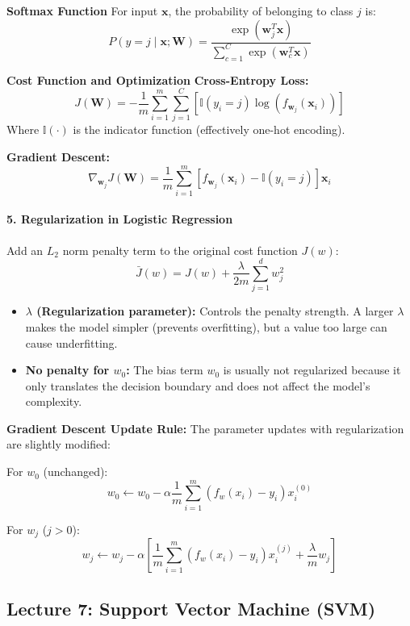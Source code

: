 \documentclass[
]{ctexart}
\providecommand{\tightlist}{%
  \setlength{\itemsep}{0pt}\setlength{\parskip}{0pt}}
\begin{document}
\textbf{Softmax Function} For input \(\mathbf{x}\), the probability of
belonging to class \(j\) is:
\[P(y = j \mid \mathbf{x}; \mathbf{W}) = \frac{\exp(\mathbf{w}_j^T \mathbf{x})}{\sum_{c=1}^C \exp(\mathbf{w}_c^T \mathbf{x})}\]

\textbf{Cost Function and Optimization} \textbf{Cross-Entropy Loss:}
\[J(\mathbf{W}) = -\frac{1}{m} \sum_{i=1}^m \sum_{j=1}^C [\mathbb{I}(y_i = j) \log(f_{\mathbf{w}_j}(\mathbf{x}_i))]\]
Where \(\mathbb{I}(\cdot)\) is the indicator function (effectively
one-hot encoding).

\textbf{Gradient Descent:}
\[\nabla_{\mathbf{w}_j} J(\mathbf{W}) = \frac{1}{m} \sum_{i=1}^m [f_{\mathbf{w}_j}(\mathbf{x}_i) - \mathbb{I}(y_i = j)] \mathbf{x}_i\]

\paragraph{5. Regularization in Logistic
Regression}\label{regularization-in-logistic-regression}

Add an \(L_2\) norm penalty term to the original cost function \(J(w)\):
\[\bar{J}(w) = J(w) + \frac{\lambda}{2m} \sum_{j=1}^d w_j^2\]

\begin{itemize}
\tightlist
\item
  \textbf{\(\lambda\) (Regularization parameter):} Controls the penalty
  strength. A larger \(\lambda\) makes the model simpler (prevents
  overfitting), but a value too large can cause underfitting.
\item
  \textbf{No penalty for \(w_0\):} The bias term \(w_0\) is usually not
  regularized because it only translates the decision boundary and does
  not affect the model's complexity.
\end{itemize}

\textbf{Gradient Descent Update Rule:} The parameter updates with
regularization are slightly modified:

For \(w_0\) (unchanged):
\[w_0 \leftarrow w_0 - \alpha \frac{1}{m} \sum_{i=1}^m (f_w(x_i) - y_i) x_i^{(0)}\]

For \(w_j\) (\(j > 0\)):
\[w_j \leftarrow w_j - \alpha \left[ \frac{1}{m} \sum_{i=1}^m (f_w(x_i) - y_i) x_i^{(j)} + \frac{\lambda}{m} w_j \right]\]


\clearpage

\subsection{Lecture 7: Support Vector Machine
(SVM)}\label{lecture-7-support-vector-machine-svm}
\end{document}
